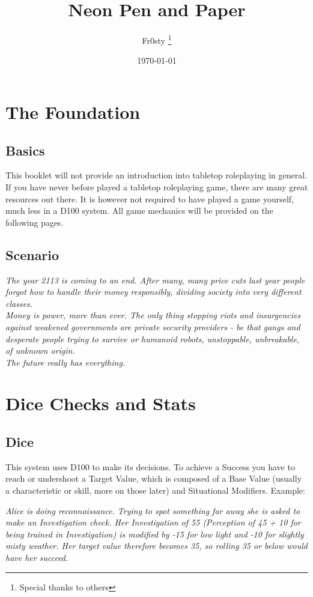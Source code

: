 \documentclass[12pt,a4paper,openany]{book}
\title{Neon Pen and Paper}
\author{Fr0sty \thanks{Special thanks to others}}
\date{\today}
\newenvironment{exampleblock}[1][1]
{\hfill\begin{minipage}{\dimexpr\textwidth-#1cm}}
{\end{minipage}\par}
\begin{document}
	\maketitle
	\tableofcontents
	
	\chapter{The Foundation}
	\section{Basics}
	This booklet will not provide an introduction into tabletop roleplaying in general. If you have never before played a tabletop roleplaying game, there are many great resources out there. It is however not required to have played a game yourself, much less in a D100 system. All game mechanics will be provided on the following pages.
	\section{Scenario}
	\begin{exampleblock}\textit{
		The year 2113 is coming to an end. After many, many price cuts last year people forgot how to handle their money responsibly, dividing society into \emph{very} different classes. \\
		Money is power, more than ever. The only thing stopping riots and insurgencies against weakened governments are private security providers - be that gangs and desperate people trying to survive or humanoid robots, unstoppable, unbreakable, of unknown origin. \\
		The future really has everything.
	}\end{exampleblock}
	
	\chapter{Dice Checks and Stats}
	\section{Dice}
	This system uses D100 to make its decisions. To achieve a Success you have to reach or undershoot a Target Value, which is composed of a Base Value (usually a characteristic or skill, more on those later) and Situational Modifiers. Example:
	
	\begin{exampleblock}
		\textit{Alice is doing reconnaissance. Trying to spot something far away she is asked to make an Investigation check. Her Investigation of 55 (Perception of 45 + 10 for being trained in Investigation) is modified by -15 for low light and -10 for slightly misty weather. Her target value therefore becomes 35, so rolling 35 or below would have her succeed.}
	\end{exampleblock}
\end{document}
